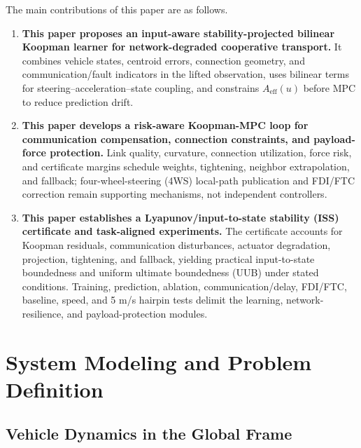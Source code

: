 \documentclass[twocolumn,3p,times,procedia]{elsarticle}
\begin{document}
The main contributions of this paper are as follows.
\begin{enumerate}
\item \textbf{This paper proposes an input-aware stability-projected bilinear Koopman learner for network-degraded cooperative transport.} It combines vehicle states, centroid errors, connection geometry, and communication/fault indicators in the lifted observation, uses bilinear terms for steering--acceleration--state coupling, and constrains $A_{\mathrm{eff}}(u)$ before MPC to reduce prediction drift.
\item \textbf{This paper develops a risk-aware Koopman-MPC loop for communication compensation, connection constraints, and payload-force protection.} Link quality, curvature, connection utilization, force risk, and certificate margins schedule weights, tightening, neighbor extrapolation, and fallback; four-wheel-steering (4WS) local-path publication and FDI/FTC correction remain supporting mechanisms, not independent controllers.
\item \textbf{This paper establishes a Lyapunov/input-to-state stability (ISS) certificate and task-aligned experiments.} The certificate accounts for Koopman residuals, communication disturbances, actuator degradation, projection, tightening, and fallback, yielding practical input-to-state boundedness and uniform ultimate boundedness (UUB) under stated conditions. Training, prediction, ablation, communication/delay, FDI/FTC, baseline, speed, and 5 m/s hairpin tests delimit the learning, network-resilience, and payload-protection modules.
\end{enumerate}

\section{System Modeling and Problem Definition}

\subsection{Vehicle Dynamics in the Global Frame}
\end{document}
